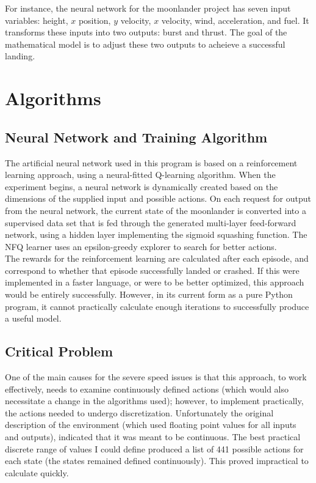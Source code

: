 \documentclass[12pt, article]{scrartcl}
\begin{document}
For instance, the neural network for the moonlander project has seven input variables: height, $x$ position, $y$ velocity, $x$ velocity, wind, acceleration, and fuel. It transforms these inputs into two outputs: burst and thrust. The goal of the mathematical model is to adjust these two outputs to acheieve a successful landing. \\

\section{Algorithms}
\subsection{Neural Network and Training Algorithm}
The artificial neural network used in this program is based on a reinforcement learning approach, using a neural-fitted Q-learning algorithm. When the experiment begins, a neural network is dynamically created based on the dimensions of the supplied input and possible actions. On each request for output from the neural network, the current state of the moonlander is converted into a supervised data set that is fed through the generated multi-layer feed-forward network, using a hidden layer implementing the sigmoid squashing function. The NFQ learner uses an epsilon-greedy explorer to search for better actions. \\

The rewards for the reinforcement learning are calculated after each episode, and correspond to whether that episode successfully landed or crashed. If this were implemented in a faster language, or were to be better optimized, this approach would be entirely successfully. However, in its current form as a pure Python program, it cannot practically calculate enough iterations to successfully produce a useful model. \\

\subsection{Critical Problem}
One of the main causes for the severe speed issues is that this approach, to work effectively, needs to examine continuously defined actions (which would also necessitate a change in the algorithms used); however, to implement practically, the actions needed to undergo discretization. Unfortunately the original description of the environment (which used floating point values for all inputs and outputs), indicated that it was meant to be continuous. The best practical discrete range of values I could define produced a list of 441 possible actions for each state (the states remained defined continuously). This proved impractical to calculate quickly. \\
\end{document}
